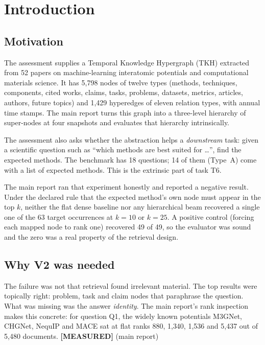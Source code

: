 \documentclass[11pt,a4paper]{article}
\theoremstyle{remark}
\newcommand{\vtag}[2]{{\sffamily\scriptsize\bfseries\textcolor{#1}{[#2]}}}
\newcommand{\Mtag}{\vtag{measgreen}{MEASURED}}
\begin{document}
\clearpage
\tableofcontents
\clearpage
\listoffigures
\listoftables
\listofalgorithms
\clearpage

\section{Introduction}
\label{sec:intro}

\subsection{Motivation}

The assessment supplies a Temporal Knowledge Hypergraph (TKH) extracted from 52 papers on
machine-learning interatomic potentials and computational materials science. It has
5{,}798 nodes of twelve types (methods, techniques, components, cited works, claims,
tasks, problems, datasets, metrics, articles, authors, future topics) and 1{,}429
hyperedges of eleven relation types, with annual time stamps. The main report
\citep{burduli2026tshc} turns this graph into a three-level hierarchy of super-nodes at
four snapshots and evaluates that hierarchy intrinsically.

The assessment also asks whether the abstraction helps a \emph{downstream} task: given a
scientific question such as ``which methods are best suited for \dots'', find the
expected methods. The benchmark has 18 questions; 14 of them (Type~A) come with a list of
expected methods. This is the extrinsic part of task T6.

The main report ran that experiment honestly and reported a negative result. Under the
declared rule that the expected method's own node must appear in the top $k$, neither the
flat dense baseline nor any hierarchical beam recovered a single one of the 63 target
occurrences at $k=10$ or $k=25$. A positive control (forcing each mapped node to rank
one) recovered 49 of 49, so the evaluator was sound and the zero was a real property of
the retrieval design.

\subsection{Why V2 was needed}

The failure was not that retrieval found irrelevant material. The top results were
topically right: problem, task and claim nodes that paraphrase the question. What was
missing was the answer \emph{identity}. The main report's rank inspection makes this
concrete: for question Q1, the widely known potentials M3GNet, CHGNet, NequIP and MACE
sat at flat ranks 880, 1{,}340, 1{,}536 and 5{,}437 out of 5{,}480 documents.
\Mtag{} (main report)
\end{document}

